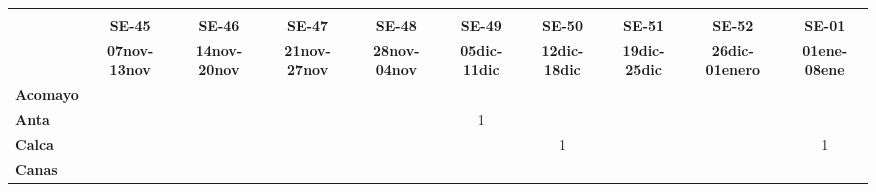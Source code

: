 \begin{tabular}{lccccccccc}
	\textbf{}              & \multicolumn{1}{l}{}                        & \multicolumn{1}{l}{}      & \multicolumn{1}{l}{}                         & \multicolumn{1}{l}{}                         & \multicolumn{1}{l}{}                         & \multicolumn{1}{l}{}                        & \multicolumn{1}{l}{}                         & \multicolumn{1}{l}{}                         & \multicolumn{1}{l}{}     \\
	\textbf{}                                                                               
	 
	&\textbf{SE-45} 							&\textbf{SE-46} 
	&\textbf{SE-47}								&\textbf{SE-48}  				  &\textbf{SE-49}
	&\textbf{SE-50}								&\textbf{SE-51}					  &\textbf{SE-52}
	&\textbf{SE-01}\\
		\textbf{}              
	&\textbf{07nov-13nov} 
	&\textbf{14nov-20nov} 						&\textbf{21nov-27nov} 	  		&\textbf{28nov-04nov} 	
	&\textbf{05dic-11dic}						&\textbf{12dic-18dic}			&\textbf{19dic-25dic}
	&\textbf{26dic-01enero}						&\textbf{01ene-08ene}\\
	\textbf{Acomayo}                        	
	&\cellcolor[HTML]{FCC46C}          			&\cellcolor[HTML]{FCC46C}                   &\cellcolor[HTML]{FCC46C}  			        &\cellcolor[HTML]{FCC46C}          			&\cellcolor[HTML]{FCC46C} 					&\cellcolor[HTML]{FCC46C} 	    			&\cellcolor[HTML]{FCC46C}				    &\cellcolor[HTML]{FCC46C}
	&\cellcolor[HTML]{FCC46C}\\
	\textbf{Anta}                                                          		
	&\cellcolor[HTML]{FCC46C}		  			&\cellcolor[HTML]{FCC46C}					&\cellcolor[HTML]{FCC46C}					&\cellcolor[HTML]{FCC46C} 					
	&1											&\cellcolor[HTML]{FCC46C}					
	&\cellcolor[HTML]{FCC46C}					&\cellcolor[HTML]{FCC46C} 
	&\cellcolor[HTML]{FCC46C}\\
	\textbf{Calca}      				       
	&\cellcolor[HTML]{FCC46C}         			&\cellcolor[HTML]{FCC46C}                   &\cellcolor[HTML]{FCC46C}                   &\cellcolor[HTML]{FCC46C}  		            &\cellcolor[HTML]{FCC46C} 					&1 								            
	&\cellcolor[HTML]{FCC46C}	&\cellcolor[HTML]{FCC46C} &1\\                										
	\textbf{Canas}                              
	&\cellcolor[HTML]{FCC46C}                   &\cellcolor[HTML]{FCC46C} 					&\cellcolor[HTML]{FCC46C}       			&\cellcolor[HTML]{FCC46C} 
	&\cellcolor[HTML]{FCC46C} 					&\cellcolor[HTML]{FCC46C} 		&\cellcolor[HTML]{FCC46C}					&\cellcolor[HTML]{FCC46C} 		

\end{tabular}

